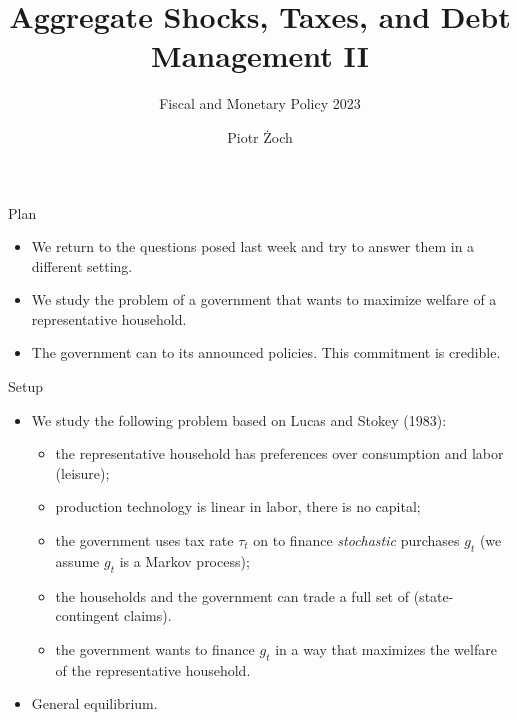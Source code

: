 \documentclass[11pt,xcolor={dvipsnames},hyperref={pdftex,pdfpagemode=UseNone,hidelinks,pdfdisplaydoctitle=true},usepdftitle=false]{beamer}
\begin{document}
\title{Aggregate Shocks, Taxes, and Debt Management II}
\subtitle{Fiscal and Monetary Policy 2023}

\author{Piotr Żoch}%
\frame{\titlepage}

\begin{frame}{Plan}
    \begin{itemize}
    \item We return to the questions posed last week and try to answer them in a different setting.
    \item We study the problem of a government that wants to maximize welfare of a representative household.
    \item The government can  to its announced policies. This commitment is credible.
    \end{itemize}
\end{frame}


    \begin{frame}
    \end{frame}

    \begin{frame}{Setup}
    \begin{itemize}
    \item We study the following problem based on Lucas and Stokey (1983):
    \begin{itemize}
    \item the representative household has preferences over consumption and labor (leisure);
    \item production technology is linear in labor, there is no capital;
    \item the government uses  tax rate $\tau_{t}$ on  to finance \emph{stochastic}
    purchases $g_{t}$ (we assume $g_{t}$ is a Markov process);
    \item the households and the government can trade a full set of  (state-contingent claims).
    \item the government wants to finance $g_{t}$ in a way that maximizes the welfare of the representative household.
    \end{itemize}
    \item General equilibrium.
    \end{itemize}
    \end{frame}
\end{document}
